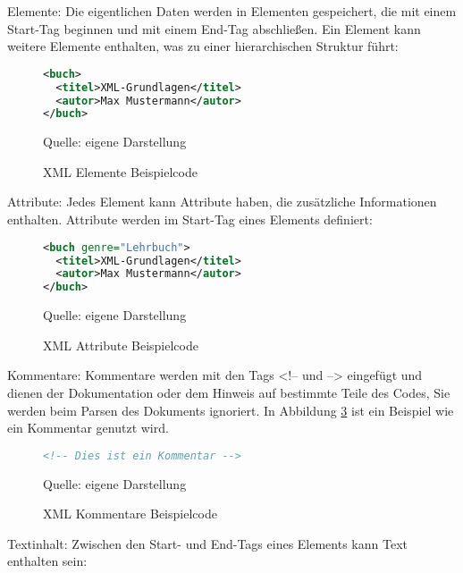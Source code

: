 Elemente: Die eigentlichen Daten werden in Elementen gespeichert, die mit einem Start-Tag beginnen und mit einem End-Tag abschließen.
Ein Element kann weitere Elemente enthalten, was zu einer hierarchischen Struktur führt:

\begin{figure}[H]
\centering
\begin{minipage}{0.95\textwidth}
\begin{lstlisting}[language=XML]
<buch>
  <titel>XML-Grundlagen</titel>
  <autor>Max Mustermann</autor>
</buch>
\end{lstlisting}
\end{minipage}
\caption{XML Elemente Beispielcode}
\label{fig:XML Elemente Beispielcode}
    {Quelle: eigene Darstellung}
\end{figure}

Attribute: Jedes Element kann Attribute haben, die zusätzliche Informationen enthalten.
Attribute werden im Start-Tag eines Elements definiert:

\begin{figure}[H]
\centering
\begin{minipage}{0.95\textwidth}
\begin{lstlisting}[language=XML]
<buch genre="Lehrbuch">
  <titel>XML-Grundlagen</titel>
  <autor>Max Mustermann</autor>
</buch>
\end{lstlisting}
\end{minipage}
\caption{XML Attribute Beispielcode}
\label{fig:XML Attribute Beispielcode}
    {Quelle: eigene Darstellung}
\end{figure}

Kommentare: Kommentare werden mit den Tags <!-- und --> eingefügt und dienen der Dokumentation oder dem Hinweis auf bestimmte Teile des Codes,
Sie werden beim Parsen des Dokuments ignoriert. In Abbildung \ref{fig:XML Kommentare Beispielcode} ist ein Beispiel wie
ein Kommentar genutzt wird.

\begin{figure}[H]
\centering
\begin{minipage}{0.95\textwidth}
\begin{lstlisting}[language=XML]
<!-- Dies ist ein Kommentar -->
\end{lstlisting}
\end{minipage}
\caption{XML Kommentare Beispielcode}
\label{fig:XML Kommentare Beispielcode}
    {Quelle: eigene Darstellung}
\end{figure}

Textinhalt: Zwischen den Start- und End-Tags eines Elements kann Text enthalten sein:


